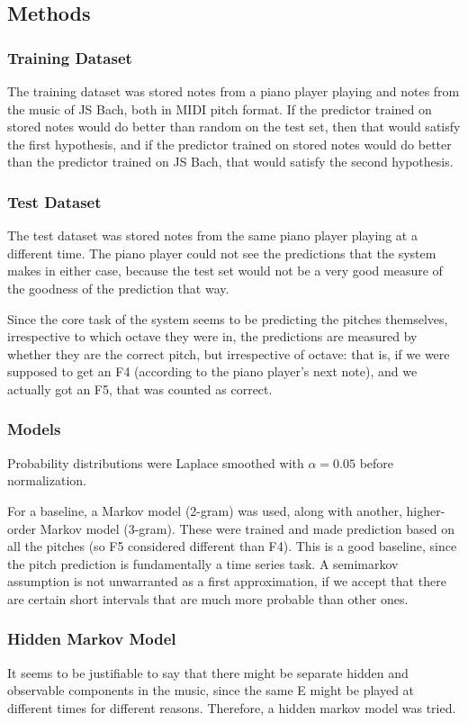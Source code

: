 \documentclass{article}
\begin{document}
\subsection*{Methods}
\subsubsection*{Training Dataset}
The training dataset was stored notes from a piano player playing and notes from the music of JS Bach, both in MIDI pitch format. If the predictor trained on stored notes would do better than random on the test set, then that would satisfy the first hypothesis, and if the predictor trained on stored notes would do better than the predictor trained on JS Bach, that would satisfy the second hypothesis.
\subsubsection*{Test Dataset}
The test dataset was stored notes from the same piano player playing at a different time. The piano player could not see the predictions that the system makes in either case, because the test set would not be a very good measure of the goodness of the prediction that way.

Since the core task of the system seems to be predicting the pitches themselves, irrespective to which octave they were in, the predictions are measured by whether they are the correct pitch, but irrespective of octave: that is, if we were supposed to get an F4 (according to the piano player's next note), and we actually got an F5, that was counted as correct.
\subsubsection*{Models}

Probability distributions were Laplace smoothed with $\alpha = 0.05$ before normalization.

For a baseline, a Markov model (2-gram) was used, along with another, higher-order Markov model (3-gram). These were trained and made prediction based on all the pitches (so F5 considered different than F4). This is a good baseline, since the pitch prediction is fundamentally a time series task. A semimarkov assumption is not unwarranted as a first approximation, if we accept that there are certain short intervals that are much more probable than other ones.

\subsubsection*{Hidden Markov Model}
It seems to be justifiable to say that there might be separate hidden and observable components in the music, since the same E might be played at different times for different reasons. Therefore, a hidden markov model was tried.
\end{document}
